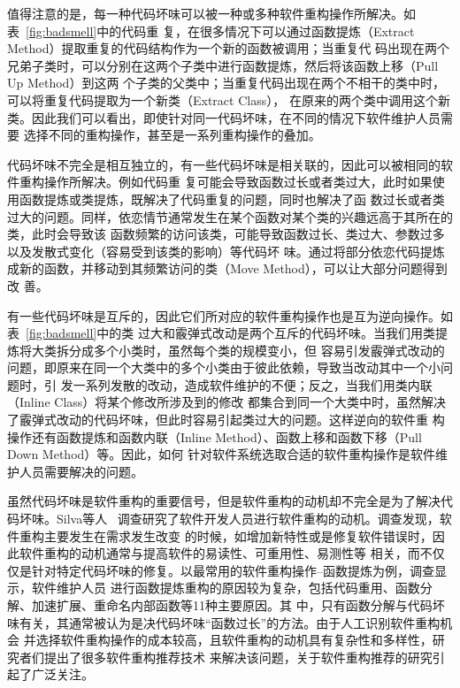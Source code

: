 值得注意的是，每一种代码坏味可以被一种或多种软件重构操作所解决。如表~\ref{fig:badsmell}中的代码重
复，在很多情况下可以通过函数提炼（Extract Method）提取重复的代码结构作为一个新的函数被调用；当重复代
码出现在两个兄弟子类时，可以分别在这两个子类中进行函数提炼，然后将该函数上移（Pull Up Method）到这两
个子类的父类中；当重复代码出现在两个不相干的类中时，可以将重复代码提取为一个新类（Extract Class），
在原来的两个类中调用这个新类。因此我们可以看出，即使针对同一代码坏味，在不同的情况下软件维护人员需要
选择不同的重构操作，甚至是一系列重构操作的叠加。

代码坏味不完全是相互独立的，有一些代码坏味是相关联的，因此可以被相同的软件重构操作所解决。例如代码重
复可能会导致函数过长或者类过大，此时如果使用函数提炼或类提炼，既解决了代码重复的问题，同时也解决了函
数过长或者类过大的问题。同样，依恋情节通常发生在某个函数对某个类的兴趣远高于其所在的类，此时会导致该
函数频繁的访问该类，可能导致函数过长、类过大、参数过多以及发散式变化（容易受到该类的影响）等代码坏
味。通过将部分依恋代码提炼成新的函数，并移动到其频繁访问的类（Move Method），可以让大部分问题得到改
善。

有一些代码坏味是互斥的，因此它们所对应的软件重构操作也是互为逆向操作。如表~\ref{fig:badsmell}中的类
过大和霰弹式改动是两个互斥的代码坏味。当我们用类提炼将大类拆分成多个小类时，虽然每个类的规模变小，但
容易引发霰弹式改动的问题，即原来在同一个大类中的多个小类由于彼此依赖，导致当改动其中一个小问题时，引
发一系列发散的改动，造成软件维护的不便；反之，当我们用类内联（Inline Class）将某个修改所涉及到的修改
都集合到同一个大类中时，虽然解决了霰弹式改动的代码坏味，但此时容易引起类过大的问题。这样逆向的软件重
构操作还有函数提炼和函数内联（Inline Method）、函数上移和函数下移（Pull Down Method）等。因此，如何
针对软件系统选取合适的软件重构操作是软件维护人员需要解决的问题。

虽然代码坏味是软件重构的重要信号，但是软件重构的动机却不完全是为了解决代码坏味。Silva等人
~\cite{silva2016we}调查研究了软件开发人员进行软件重构的动机。调查发现，软件重构主要发生在需求发生改变
的时候，如增加新特性或是修复软件错误时，因此软件重构的动机通常与提高软件的易读性、可重用性、易测性等
相关，而不仅仅是针对特定代码坏味的修复。以最常用的软件重构操作--函数提炼为例，调查显示，软件维护人员
进行函数提炼重构的原因较为复杂，包括代码重用、函数分解、加速扩展、重命名内部函数等11种主要原因。其
中，只有函数分解与代码坏味有关，其通常被认为是决代码坏味``函数过长''的方法。由于人工识别软件重构机会
并选择软件重构操作的成本较高，且软件重构的动机具有复杂性和多样性，研究者们提出了很多软件重构推荐技术
来解决该问题，关于软件重构推荐的研究引起了广泛关注。

